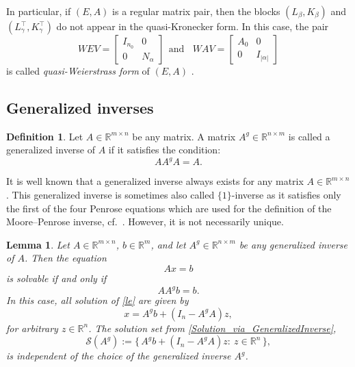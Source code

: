 \documentclass[preprint,12pt]{elsarticle}
\numberwithin{equation}{section}
\newtheorem{lemma}[theorem]{Lemma}
\theoremstyle{definition}
\newtheorem{definition}[theorem]{Definition}
\begin{document}
In particular, if $(E,A)$ is a regular matrix pair, then the blocks $(L_{\beta}, K_{\beta})$ and $(L_{\gamma}^\top, K_{\gamma}^\top)$ do not appear in the quasi-Kronecker form. In this case, the pair
\begin{equation}\label{WCF_1}
WEV=
\begin{bmatrix} I_{n_0}& 0 \\
0&  N_\alpha
\end{bmatrix} ~~ \text{and}~~~~ WAV=
\begin{bmatrix} A_0& 0 \\
0& I_{|\alpha|}
\end{bmatrix}
\end{equation}
is called \emph{quasi-Weierstrass form} of $(E,A)$
\cite{BT12,Berger2013addition}.






\subsection{Generalized inverses}

\begin{definition}
    Let $A\in\mathbb{R}^{m\times n}$ be any matrix. A matrix $A^g\in\mathbb{R}^{n\times m}$ is called a generalized inverse of $A$ if it satisfies the condition:
\begin{equation*}
    AA^gA=A.
\end{equation*}
\end{definition}
It is well known that a generalized inverse always exists for any matrix $A\in\mathbb{R}^{m\times n}$.
This generalized inverse is sometimes also called 
$\{1\}$-inverse as it satisfies only the first of the four Penrose equations which are used for the definition of the Moore--Penrose inverse, cf.\   \cite{benisrael2006GeneralizedInverses}. 
However, it is not necessarily unique.



 \begin{lemma}\label{lemma_Solution_AE_via_GenInv}
Let \(A\in \mathbb{R}^{m\times n}\), \(b\in\mathbb{R}^m\), and let \(A^g\in\mathbb{R}^{n\times m}\) be any generalized inverse of \(A\). Then the equation
\begin{equation}\label{le}
Ax=b
\end{equation}
is solvable if and only if
\begin{equation}\label{AAgb=b}
AA^g b=b.
\end{equation}
In this case, all solution of \eqref{le} are given by
 \begin{equation}\label{Solution_via_GeneralizedInverse}
    x=A^gb+(I_n-A^gA)z,
 \end{equation}
 for arbitrary $z\in\mathbb{R}^n$.
The solution set from \eqref{Solution_via_GeneralizedInverse},
\[
\mathcal S(A^g):=\bigl\{\,A^g b+(I_n-A^gA)z:\ z\in\mathbb{R}^n\,\bigr\},
\]
is independent of the choice of the generalized inverse $A^g$.
\end{lemma}
\end{document}
